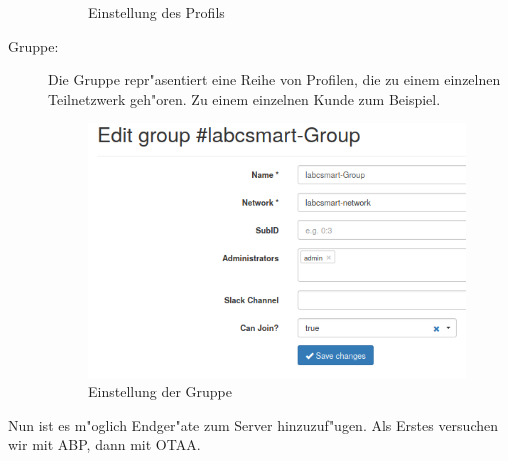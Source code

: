 \begin{description}
	\begin{figure}[h!]
		\centering
		\caption{Einstellung des Profils}
	\end{figure}
	
	\item[Gruppe:] Die Gruppe repr"asentiert eine Reihe von Profilen,
	die zu einem einzelnen Teilnetzwerk geh"oren. Zu einem einzelnen
	Kunde zum Beispiel.
	\begin{figure}[h]
		\centering
		\includegraphics[width=10cm]{source/images/Labcsmart_group}
		\caption{Einstellung der Gruppe\label{fig:group}}
	\end{figure}
\end{description}
\vspace{10cm}
Nun ist es m"oglich Endger"ate zum Server hinzuzuf"ugen. Als Erstes
versuchen wir mit ABP, dann mit OTAA.

